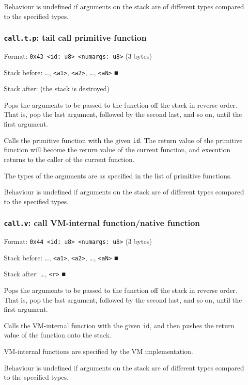 Behaviour is undefined if arguments on the stack are of different types
compared to the specified types.

\subsubsection{\texttt{call.t.p}: tail call primitive function}
\label{sec:orgd22c74d}
Format: \texttt{0x43 <id: u8> <numargs: u8>} (3 bytes)

Stack before: \ldots{}​, \texttt{<a1>}, \texttt{<a2>}, \ldots{}​, \texttt{<aN>} ■

Stack after: (the stack is destroyed)

Pops the arguments to be passed to the function off the stack in reverse
order. That is, pop the last argument, followed by the second last, and
so on, until the first argument.

Calls the primitive function with the given \texttt{id}. The return value of
the primitive function will become the return value of the current
function, and execution returns to the caller of the current function.

The types of the arguments are as specified in the list of primitive
functions.

Behaviour is undefined if arguments on the stack are of different types
compared to the specified types.

\subsubsection{\texttt{call.v}: call VM-internal function/native function}
\label{sec:org008ae6e}
Format: \texttt{0x44 <id: u8> <numargs: u8>} (3 bytes)

Stack before: \ldots{}​, \texttt{<a1>}, \texttt{<a2>}, \ldots{}​, \texttt{<aN>} ■

Stack after: \ldots{}​, \texttt{<r>} ■

Pops the arguments to be passed to the function off the stack in reverse
order. That is, pop the last argument, followed by the second last, and
so on, until the first argument.

Calls the VM-internal function with the given \texttt{id}, and then pushes the
return value of the function onto the stack.

VM-internal functions are specified by the VM implementation.

Behaviour is undefined if arguments on the stack are of different types
compared to the specified types.


